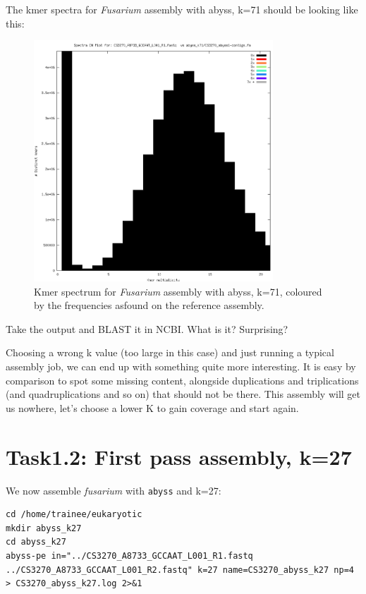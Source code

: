 The kmer spectra for \textit{Fusarium} assembly with abyss, k=71 should be looking like this:
\begin{figure}[H]
\centering
\includegraphics[width=0.8\textwidth]{handout/abyss-k71.png}
\caption{Kmer spectrum for \textit{Fusarium} assembly with abyss, k=71, coloured by the frequencies asfound on the reference assembly.}
\label{fig:fusariumk71}
\end{figure}

Take the output and BLAST it in NCBI. What is it? Surprising?

\begin{steps}
\end{steps}

Choosing a wrong k value (too large in this case) and just running a typical assembly job, we can end up with something quite more interesting. It is easy by comparison to spot some missing content, alongside duplications and triplications (and quadruplications and so on) that should not be there.
This assembly will get us nowhere, let's choose a lower K to gain coverage and start again.

\section{Task1.2: First pass assembly, k=27}
\begin{steps}
We now assemble \textit{fusarium} with \texttt{abyss} and k=27:
\begin{lstlisting}
cd /home/trainee/eukaryotic
mkdir abyss_k27
cd abyss_k27
abyss-pe in="../CS3270_A8733_GCCAAT_L001_R1.fastq ../CS3270_A8733_GCCAAT_L001_R2.fastq" k=27 name=CS3270_abyss_k27 np=4 > CS3270_abyss_k27.log 2>&1
\end{lstlisting}
\end{steps}

